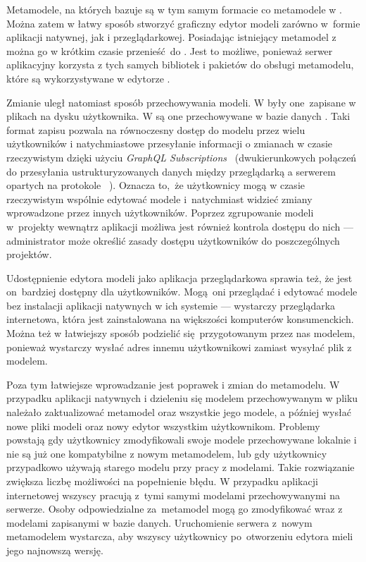Metamodele, na których bazuje \SiriusWeb{} są w tym samym formacie \EMF{} co
metamodele w \SiriusDesktop{}. Można zatem w łatwy sposób stworzyć
graficzny edytor modeli zarówno w~formie aplikacji natywnej, jak i
przeglądarkowej. Posiadając istniejący metamodel 
z~\SiriusDesktop{} można go w krótkim czasie przenieść do \SiriusWeb{}. Jest
to
możliwe, ponieważ serwer aplikacyjny korzysta z tych samych bibliotek i
pakietów do obsługi metamodelu, które są wykorzystywane w edytorze
\SiriusDesktop{}.

Zmianie uległ natomiast sposób przechowywania modeli. W \SiriusDesktop{}
były one~zapisane w plikach na dysku użytkownika. W \SiriusWeb{} są one
przechowywane w bazie danych \PostgreSQL{}. Taki format zapisu pozwala na
równoczesny dostęp do modelu przez wielu użytkowników i natychmiastowe
przesyłanie informacji o zmianach w czasie rzeczywistym dzięki użyciu
\emph{GraphQL Subscriptions}~\cite{graphql-subscriptions} (dwukierunkowych
połączeń do przesyłania ustrukturyzowanych danych między przeglądarką a
serwerem opartych na protokole \WebSocket{}~\cite{wikipedia-websocket}).
Oznacza to, że użytkownicy mogą w czasie rzeczywistym wspólnie edytować modele
i~natychmiast widzieć zmiany wprowadzone przez innych użytkowników.
Poprzez zgrupowanie modeli w~projekty wewnątrz aplikacji \SiriusWeb{}
możliwa jest również kontrola dostępu do nich --- administrator może określić
zasady dostępu użytkowników do poszczególnych projektów.

Udostępnienie edytora modeli jako aplikacja przeglądarkowa sprawia też, że jest
on~bardziej dostępny dla użytkowników. Mogą oni przeglądać i edytować modele
bez instalacji aplikacji natywnych w ich systemie --- wystarczy przeglądarka
internetowa, która jest zainstalowana na większości komputerów konsumenckich.
Można też w łatwiejszy sposób podzielić się~przygotowanym przez nas modelem,
ponieważ wystarczy wysłać adres  innemu użytkownikowi zamiast
wysyłać plik z modelem.

Poza tym łatwiejsze wprowadzanie jest poprawek i zmian do metamodelu.
W przypadku aplikacji natywnych i dzieleniu się modelem przechowywanym w pliku
należało zaktualizować metamodel oraz wszystkie jego modele, a później wysłać
nowe pliki modeli oraz nowy edytor wszystkim użytkownikom. Problemy powstają
gdy użytkownicy zmodyfikowali swoje modele przechowywane lokalnie i nie są już
one kompatybilne z nowym metamodelem, lub gdy użytkownicy przypadkowo używają
starego modelu przy pracy z modelami. Takie rozwiązanie zwiększa liczbę
możliwości na popełnienie błędu. W przypadku aplikacji internetowej wszyscy
pracują z~tymi samymi modelami przechowywanymi na serwerze. Osoby
odpowiedzialne za~metamodel mogą go zmodyfikować wraz z modelami zapisanymi w
bazie danych. Uruchomienie serwera z~nowym metamodelem wystarcza, aby wszyscy
użytkownicy po~otworzeniu edytora \SiriusWeb{} mieli jego najnowszą
wersję.
